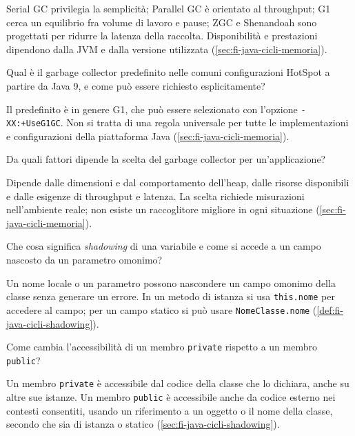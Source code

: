 Serial GC privilegia la semplicità; Parallel GC è orientato al
throughput; G1 cerca un equilibrio fra volume di lavoro e
pause; ZGC e Shenandoah sono progettati per ridurre la latenza
della raccolta. Disponibilità e prestazioni dipendono dalla JVM
e dalla versione utilizzata
(\cref{sec:fi-java-cicli-memoria}).

\begin{exercise}
\label{ex:fi-esercizi-java-cicli-gc-default}
Qual è il garbage collector predefinito nelle comuni
configurazioni HotSpot a partire da Java 9, e come può
essere richiesto esplicitamente?
\end{exercise}

Il predefinito è in genere G1, che può essere selezionato con
l'opzione \texttt{-XX:+UseG1GC}. Non si tratta di una regola
universale per tutte le implementazioni e configurazioni della
piattaforma Java
(\cref{sec:fi-java-cicli-memoria}).

\begin{exercise}
\label{ex:fi-esercizi-java-cicli-gc-criteri}
Da quali fattori dipende la scelta del garbage collector
per un'applicazione?
\end{exercise}

Dipende dalle dimensioni e dal comportamento dell'heap, dalle
risorse disponibili e dalle esigenze di throughput e latenza.
La scelta richiede misurazioni nell'ambiente reale; non esiste
un raccoglitore migliore in ogni situazione
(\cref{sec:fi-java-cicli-memoria}).

\begin{exercise}
\label{ex:fi-esercizi-java-cicli-shadowing}
Che cosa significa \emph{shadowing} di una variabile e come
si accede a un campo nascosto da un parametro omonimo?
\end{exercise}

Un nome locale o un parametro possono nascondere un campo
omonimo della classe senza generare un errore. In un metodo
di istanza si usa \texttt{this.nome} per accedere al campo;
per un campo statico si può usare \texttt{NomeClasse.nome}
(\cref{def:fi-java-cicli-shadowing}).

\begin{exercise}
\label{ex:fi-esercizi-java-cicli-private-public}
Come cambia l'accessibilità di un membro \texttt{private}
rispetto a un membro \texttt{public}?
\end{exercise}

Un membro \texttt{private} è accessibile dal codice della
classe che lo dichiara, anche su altre sue istanze. Un membro
\texttt{public} è accessibile anche da codice esterno nei
contesti consentiti, usando un riferimento a un oggetto o
il nome della classe, secondo che sia di istanza o statico
(\cref{sec:fi-java-cicli-shadowing}).
